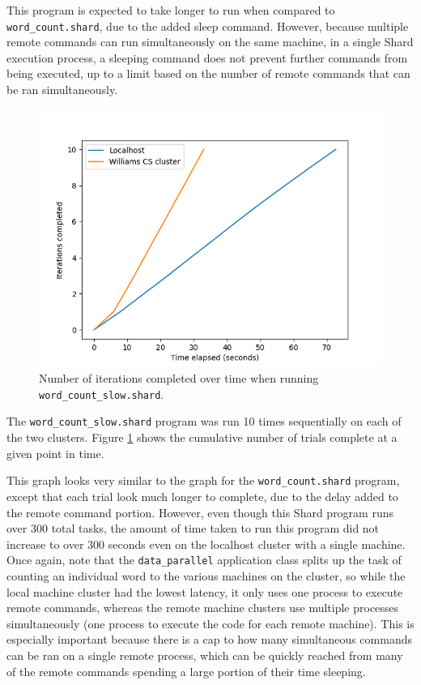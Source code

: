 \documentclass[twoside]{report}
\begin{document}
This program is expected to take longer to run when compared to \texttt{word\_count.shard}, due to the added sleep command.
However, because multiple remote commands can run simultaneously on the same machine, in a single Shard execution process, a sleeping command does not prevent further commands from being executed, up to a limit based on the number of remote commands that can be ran simultaneously.

\begin{figure}[h]
  \begin{center}
    \includegraphics[scale=0.9]{img/experiments/e3_1620960581241.png}
    \caption{Number of iterations completed over time when running \texttt{word\_count\_slow.shard}.}
    \label{fig:wordcountslow}
  \end{center}
\end{figure}

The \texttt{word\_count\_slow.shard} program was run 10 times sequentially on each of the two clusters.
Figure \ref{fig:wordcountslow} shows the cumulative number of trials complete at a given point in time.

This graph looks very similar to the graph for the \texttt{word\_count.shard} program, except that each trial look much longer to complete, due to the delay added to the remote command portion.
However, even though this Shard program runs over 300 total tasks, the amount of time taken to run this program did not increase to over 300 seconds even on the localhost cluster with a single machine.
Once again, note that the \texttt{data\_parallel} application class splits up the task of counting an individual word to the various machines on the cluster, so while the local machine cluster had the lowest latency, it only uses one process to execute remote commands, whereas the remote machine clusters use multiple processes simultaneously (one process to execute the code for each remote machine).
This is especially important because there is a cap to how many simultaneous commands can be ran on a single remote process, which can be quickly reached from many of the remote commands spending a large portion of their time sleeping.
\end{document}
